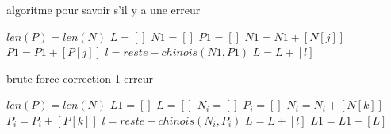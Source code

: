 \documentclass[a4paper, 11pt]{report}
\begin{document}
\begin{appendices}
    \begin{algorithm}
        \caption{algoritme pour savoir s'il y a une erreur}
        \begin{algorithmic}
            \REQUIRE $len(P)=len(N)$
            \STATE $L=[]$
            \STATE $N1=[]$
            \STATE $P1=[]$
            \STATE $N1=N1+[N[j]]$
            \STATE $P1=P1+[P[j]]$
            \ENDIF
            \ENDFOR
            \STATE $l=reste-chinois(N1,P1)$
            \STATE $L=L+[l]$
            \ENDFOR
        \end{algorithmic}
    \end{algorithm}
\end{appendices}

\begin{appendices}
    \begin{algorithm}
        \caption{brute force correction 1 erreur}
        \begin{algorithmic}
            \REQUIRE $len(P)=len(N)$
            \STATE $L1=[]$
            \STATE $L=[]$
            \STATE $N_i=[]$
            \STATE $P_i=[]$
            \STATE $N_i=N_i+[N[k]]$
            \STATE $P_i=P_i+[P[k]]$
            \ENDIF
            \ENDFOR
            \STATE $l=reste-chinois(N_i,P_i)$
            \STATE $L=L+[l]$
            \ENDFOR
            \STATE $L1=L1+[L]$
            \ENDFOR
        \end{algorithmic}
    \end{algorithm}
\end{appendices}
\end{document}
